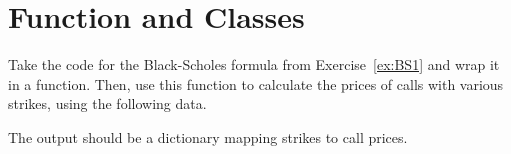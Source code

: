 \chapter{Function and Classes}\label{introduction-to-python---lesson-4}

\begin{Exercise}[label={ex:BS2}]
Take the code for the Black-Scholes formula from Exercise~\ref{ex:BS1} and wrap it in a function. Then, use this function to calculate the prices of calls with various strikes, using the following data.

\begin{Shaded}
\end{Shaded}

The output should be a dictionary mapping strikes to call prices.
\end{Exercise}
\vfill
